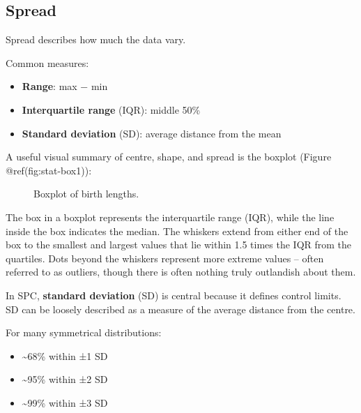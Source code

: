 \documentclass[
]{book}
\makeatletter
\newenvironment{Shaded}{\begin{snugshade}}{\end{snugshade}}
\newcommand{\FunctionTok}[1]{\textcolor[rgb]{0.13,0.29,0.53}{\textbf{#1}}}
\newcommand{\NormalTok}[1]{#1}
\newcommand{\SpecialCharTok}[1]{\textcolor[rgb]{0.81,0.36,0.00}{\textbf{#1}}}
\newcommand*\pandocbounded[1]{%
  \sbox\pandoc@box{#1}%
  \Gscale@div\@tempa{\textheight}{\dimexpr\ht\pandoc@box+\dp\pandoc@box\relax}%
  \Gscale@div\@tempb{\linewidth}{\wd\pandoc@box}%
  \ifdim\@tempb\p@<\@tempa\p@\let\@tempa\@tempb\fi%
  \ifdim\@tempa\p@<\p@\scalebox{\@tempa}{\usebox\pandoc@box}%
  \else\usebox{\pandoc@box}%
  \fi%
}
\providecommand{\tightlist}{%
  \setlength{\itemsep}{0pt}\setlength{\parskip}{0pt}}
\makeatother
\begin{document}
\subsection{Spread}\label{spread}

Spread describes how much the data vary.

Common measures:

\begin{itemize}
\tightlist
\item
  \textbf{Range}: max − min
\item
  \textbf{Interquartile range} (IQR): middle 50\%
\item
  \textbf{Standard deviation} (SD): average distance from the mean
\end{itemize}

A useful visual summary of centre, shape, and spread is the boxplot
(Figure @ref(fig:stat-box1)):

\begin{Shaded}
\end{Shaded}

\begin{figure}
\centering
\pandocbounded{}
\caption{Boxplot of birth lengths.}
\end{figure}

The box in a boxplot represents the interquartile range (IQR), while the
line inside the box indicates the median. The whiskers extend from
either end of the box to the smallest and largest values that lie within
1.5 times the IQR from the quartiles. Dots beyond the whiskers represent
more extreme values -- often referred to as outliers, though there is
often nothing truly outlandish about them.

In SPC, \textbf{standard deviation} (SD) is central because it defines
control limits. SD can be loosely described as a measure of the average
distance from the centre.

For many symmetrical distributions:

\begin{itemize}
\tightlist
\item
  \textasciitilde68\% within ±1 SD
\item
  \textasciitilde95\% within ±2 SD
\item
  \textasciitilde99\% within ±3 SD
\end{itemize}
\end{document}
